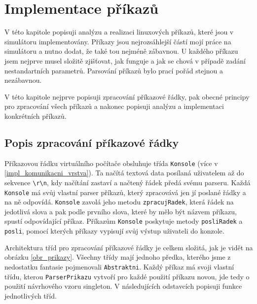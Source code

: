
\chapter{Implementace příkazů}

V této kapitole popisuji analýzu a realizaci linuxových příkazů, které jsou v simulátoru implementovány. Příkazy jsou nejrozsáhlejší částí mojí práce na simulátoru a nutno dodat, že také tou nejméně zábavnou. U každého příkazu jsem nejprve musel složitě zjišťovat, jak funguje a jak se chová v případě zadání nestandartních parametrů. Parsování příkazů bylo prací pořád stejnou a nezábavnou. 

V této kapitole nejprve popisuji zpracování příkazové řádky, pak obecné principy pro zpracování všech příkazů a nakonec popisuji analýzu a implementaci konkrétních příkazů.




\section{Popis zpracování příkazové řádky}

Příkazovou řádku virtuálního počítače obsluhuje třída \verb|Konsole| (více v \ref{impl_komunikacni_vrstva}). Ta načítá textová data posílaná uživatelem až do sekvence \verb|\r\n|, kdy načítání zastaví a načtený řádek předá svému parseru. Každá \verb|Konsole| má svůj vlastní parser příkazů, který zpracovává jen jí poslané řádky a na ně odpovídá. \verb|Konsole| zavolá jeho metodu \verb|zpracujRadek|, která řádek  na jedotlivá slova a pak podle prvního slova, které by mělo být názvem příkazu, spustí odpovídající příkaz. Příkazům \verb|Konsole| poskytuje metody \verb|posliRadek| a \verb|posli|, pomocí kterých příkazy vypisují svůj výstup uživateli do konzole.

Architektura tříd pro zpracování příkazové řádky je celkem složitá, jak je vidět na obrázku \ref{obr_prikazy}. Všechny třídy mají jednoho předka, kterého jsme z nedostatku fantasie pojmenovali \verb|Abstraktni|. Každý příkaz má svoji vlastní třídu, kterou \verb|ParserPrikazu| vytvoří pro každé použití příkazu novou, jde tedy o použití návrhového vzoru singleton. V následujících odstavcích popisuji funkce jednotlivých tříd.

